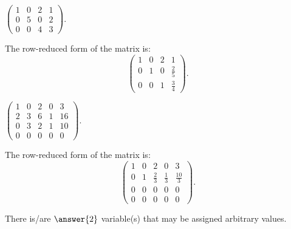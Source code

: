 \documentclass{ximera}
\begin{document}
\begin{exercise} \label{c2.3.11c}
$\left(\begin{array}{ccc|c}  1 & 0 & 2 & 1\\ 0 & 5 & 0 & 2 \\ 0 & 0 & 4 & 3
       \end{array}\right)$.
     \begin{multipleChoice}
     \end{multipleChoice}
     \begin{hint}
       The row-reduced form of the matrix is:
\[
\left(\begin{array}{rrr|r} 1 & 0 & 2 & 1 \\ 0 & 1 & 0 & \frac{2}{5}
\\ 0 & 0 & 1 & \frac{3}{4}\end{array}\right).
\]
     \end{hint}
\end{exercise}
\begin{exercise} \label{c2.3.11d}
$\left(\begin{array}{cccc|c} 1 & 0 & 2 & 0 & 3 \\ 2 & 3 & 6 & 1 & 16\\
         0 & 3 & 2 & 1 & 10 \\ 0 & 0 & 0 & 0 & 0  \end{array}\right)$.
     \begin{hint}
       The row-reduced form of the matrix is:
\[
\left(\begin{array}{rrrr|r} 1 & 0 & 2 & 0 & 3 \\ 0 & 1 & \frac{2}{3}
& \frac{1}{3} & \frac{10}{3} \\ 0 & 0 & 0 & 0 & 0 \\ 0 & 0 & 0 & 0 & 0
\end{array}\right).
\]
     \end{hint}
          \begin{multipleChoice}
     \end{multipleChoice}
     \begin{exercise}
       There is/are $\answer{2}$ variable(s) that may be assigned arbitrary values.
     \end{exercise}
\end{exercise}
\end{document}
